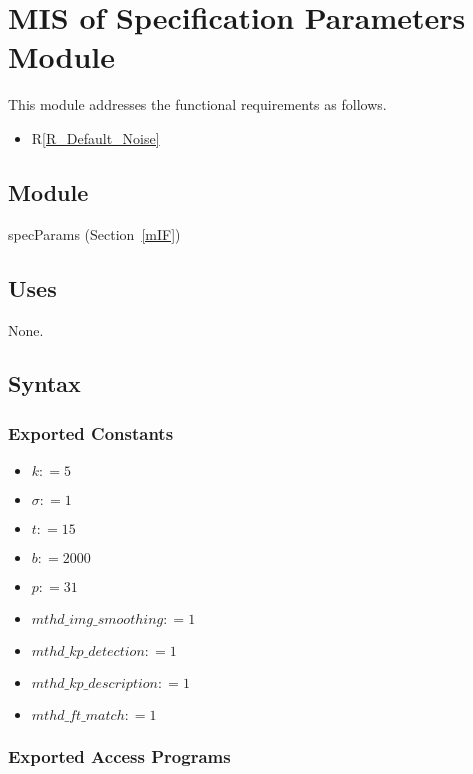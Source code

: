 \documentclass[12pt, titlepage]{article}
\begin{document}
\section{MIS of Specification Parameters Module} \label{mSP}
This module addresses the functional requirements as follows.
\begin{itemize}
  \item R\ref{R_Default_Noise}
\end{itemize}

\subsection{Module}
specParams (Section~\ref{mIF})

\subsection{Uses}
None.

\subsection{Syntax}

\subsubsection{Exported Constants}
\begin{itemize}
  \item $k: = 5$
  \item $\sigma: = 1$ 
  \item $t: = 15$ 
  \item $b: = 2000$ 
  \item $p: = 31$ 
  \item $mthd\_img\_smoothing: = 1$
  \item $mthd\_kp\_detection: = 1$ 
  \item $mthd\_kp\_description: = 1$
  \item $mthd\_ft\_match: = 1$
\end{itemize}
\subsubsection{Exported Access Programs}
\end{document}
